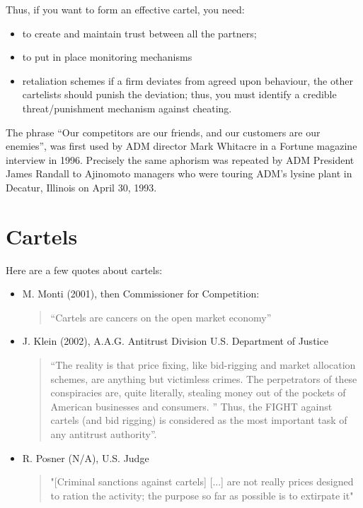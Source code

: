             Thus, if you want to form an effective cartel, you need:

            \begin{itemize}
                \item to create and maintain trust between all the partners;
                \item to put in place monitoring mechanisms
                \item retaliation schemes if a firm deviates from agreed upon behaviour, the other cartelists should punish the deviation; thus, you must identify a credible threat/punishment mechanism against cheating.
            \end{itemize}

            The phrase “Our competitors are our friends, and our customers are our enemies”, was first used by ADM director Mark Whitacre in a Fortune magazine interview in 1996. Precisely the same aphorism was repeated by ADM President James Randall to Ajinomoto managers who were touring ADM’s lysine plant in Decatur, Illinois on April 30, 1993.

\section{Cartels}

    Here are a few quotes about cartels:
    \begin{itemize}
        \item M. Monti (2001), then Commissioner for Competition:
            \begin{quote}
                “Cartels are cancers on the open market economy”
            \end{quote}
        \item J. Klein (2002), A.A.G. Antitrust Division U.S. Department of Justice
            \begin{quote}
                “The reality is that price fixing, like bid-rigging and market allocation schemes, are anything but victimless crimes. The perpetrators of these conspiracies are, quite literally, stealing money out of the pockets of American businesses and consumers. ” Thus, the FIGHT against cartels (and bid rigging) is considered as the most important task of any antitrust authority”.
            \end{quote}
        \item R. Posner (N/A), U.S. Judge
            \begin{quote}
                "[Criminal sanctions against cartels] [...] are not really prices designed to ration the activity; the purpose so far as possible is to extirpate it"
            \end{quote}
    \end{itemize}

